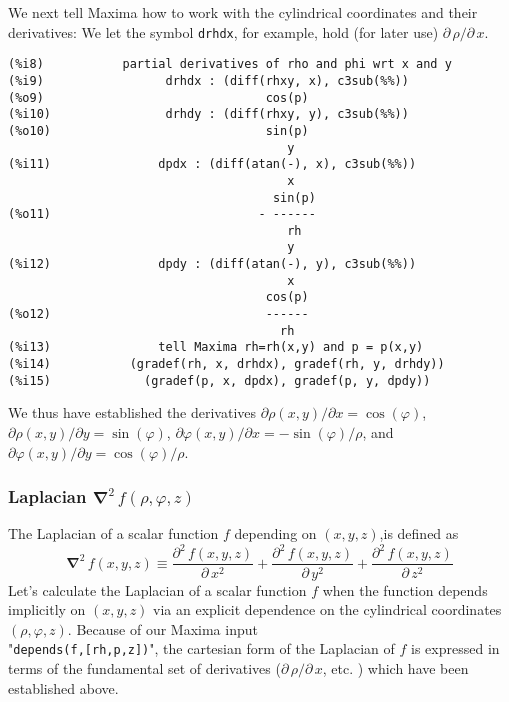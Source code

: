 \documentclass[12pt]{article}
\begin{document}
\smallskip
We next tell Maxima how to work with the cylindrical coordinates and their derivatives:
We let the symbol \verb|drhdx|, for example, hold (for later use) $\partial\, \rho / \partial\,x$.
\small
\begin{verbatim}
(%i8)           partial derivatives of rho and phi wrt x and y 
(%i9)                 drhdx : (diff(rhxy, x), c3sub(%%))
(%o9)                               cos(p)
(%i10)                drhdy : (diff(rhxy, y), c3sub(%%))
(%o10)                              sin(p)
                                       y
(%i11)               dpdx : (diff(atan(-), x), c3sub(%%))
                                       x
                                     sin(p)
(%o11)                             - ------
                                       rh
                                       y
(%i12)               dpdy : (diff(atan(-), y), c3sub(%%))
                                       x
                                    cos(p)
(%o12)                              ------
                                      rh
(%i13)               tell Maxima rh=rh(x,y) and p = p(x,y) 
(%i14)           (gradef(rh, x, drhdx), gradef(rh, y, drhdy))
(%i15)             (gradef(p, x, dpdx), gradef(p, y, dpdy))
\end{verbatim}
\normalsize
We thus have established the derivatives $\partial \rho(x,y) / \partial x = \cos(\varphi)$,
  $\partial \rho(x,y) / \partial y = \sin(\varphi)$, 
  $\partial \varphi(x,y) / \partial x = -\sin(\varphi)/\rho$, 
  and $\partial \varphi(x,y) / \partial y = \cos(\varphi)/\rho$.
  

\subsubsection{Laplacian \quad $\boldsymbol{\nabla}^2 \, f(\rho,\varphi,z)$ }
The Laplacian of a scalar function $f$ depending on $(x,y,z)$,is defined
  as
\begin{equation}
 \boldsymbol{\nabla}^2\,f(x,y,z) \equiv \frac{\partial^2 \, f(x,y,z)}{\partial \, x^2}  +
                          \frac{\partial^2 \, f(x,y,z)}{\partial \, y^2} +
						  \frac{\partial^2 \, f(x,y,z)}{\partial \, z^2}
\end{equation}
Let's calculate the Laplacian of a scalar function $f$ when
  the function depends implicitly on $(x,y,z)$ via an explicit dependence on
  the cylindrical coordinates $(\rho,\varphi,z)$.
Because of our Maxima input\\
 "\verb|depends(f,[rh,p,z])|", the cartesian form of
  the Laplacian of $f$ is expressed in terms of the fundamental set of
  derivatives ($\partial\,\rho/\partial\,x$, etc. ) which have been established above.
\end{document}
